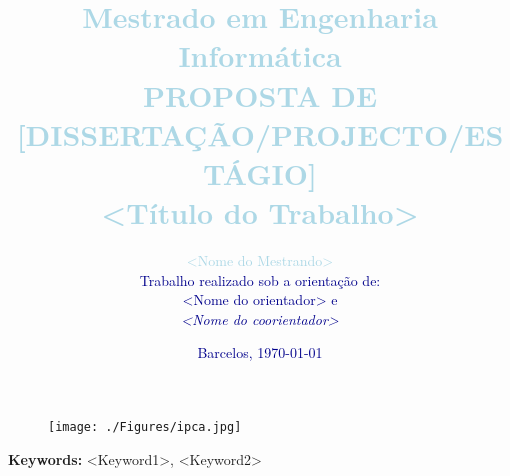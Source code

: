 \documentclass[10pt,a4paper,twoside,openright]{report}
\begin{document}

%
%

%
%
\makeatletter
\setlength{\@fptop}{0pt}
\makeatother

\begin{figure}[t!]
	\centering
	\texttt{[image: ./Figures/ipca.jpg]}
	\label{fig:ipca}
  \end{figure}

\title{
	\textbf{\Large{\textcolor{lightBlue}{Mestrado em Engenharia Informática}}}\\
	\bigskip
	\Large{\textcolor{lightBlue}{PROPOSTA DE [DISSERTAÇÃO/PROJECTO/ESTÁGIO]}}\\
	\bigskip
	\textbf{\Huge{\textcolor{lightBlue}{<Título do Trabalho>}}}
}


\author{
	\bigskip
	\huge{\textcolor{lightBlue}{<Nome do Mestrando>}}\\
	\textcolor{darkBlue}{Trabalho realizado sob a orientação de:}\\
	\textcolor{darkBlue}{<Nome do orientador> e}\\
	\textit{\textcolor{darkBlue}{<Nome do coorientador>}}
}
\date{\textcolor{darkBlue}{Barcelos, \today}}

\maketitle

%
%
\bigskip
\textbf{\Large Keywords:} <Keyword1>, <Keyword2>
\bigskip

\tableofcontents

%
%










%
%


\end{document}
